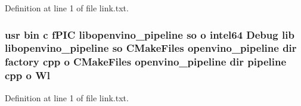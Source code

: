 Definition at line 1 of file link.\+txt.

\subsubsection[{\texorpdfstring{Wl}{Wl}}]{\setlength{\rightskip}{0pt plus 5cm}usr bin {\bf c} f\+P\+IC libopenvino\+\_\+pipeline {\bf so} o intel64 Debug lib libopenvino\+\_\+pipeline {\bf so} C\+Make\+Files openvino\+\_\+pipeline dir factory cpp o C\+Make\+Files openvino\+\_\+pipeline dir pipeline cpp o Wl}\hypertarget{lib_2CMakeFiles_2openvino__pipeline_8dir_2link_8txt_a4e8f0c7503e0544cac59a2ba0a889e25}{}\label{lib_2CMakeFiles_2openvino__pipeline_8dir_2link_8txt_a4e8f0c7503e0544cac59a2ba0a889e25}


Definition at line 1 of file link.\+txt.

